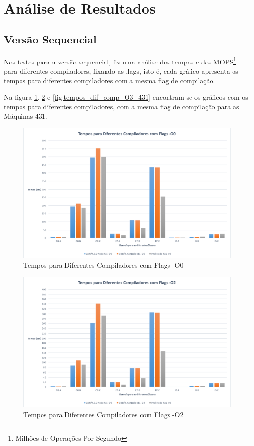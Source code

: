 \documentclass[conference,compsoc]{IEEEtran}
\begin{document}
\section{Análise de Resultados}
\subsection{Versão Sequencial}
Nos testes para a versão sequencial, fiz uma análise dos tempos e dos MOPS\footnote{Milhões de Operações Por Segundo} para diferentes compiladores, fixando as flags, isto é, cada gráfico apresenta os tempos para diferentes compiladores com a mesma flag de compilação.

Na figura \ref{fig:tempos_dif_comp_O0_431}, \ref{fig:tempos_dif_comp_O2_431} e \ref{fig:tempos_dif_comp_O3_431} encontram-se os gráficos com os tempos para diferentes compiladores, com a mesma flag de compilação para as Máquinas 431.

\begin{figure}[h!]
\centering
\includegraphics[scale=0.325]{SER/tempos_dif_comp_O0_nodo_431.png}
\caption{Tempos para Diferentes Compiladores com Flags -O0}
\label{fig:tempos_dif_comp_O0_431}
\end{figure}

\begin{figure}[h!]
\centering
\includegraphics[scale=0.325]{SER/tempos_dif_comp_O2_nodo_431.png}
\caption{Tempos para Diferentes Compiladores com Flags -O2}
\label{fig:tempos_dif_comp_O2_431}
\end{figure}
\end{document}
